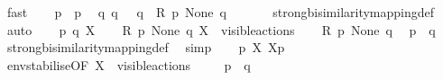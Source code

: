 \begin{isabellebody}
\ fast\isanewline
\ \ \isamarkupfalse%
\ {\isacartoucheopen}p\ {\isasymlongmapsto}{\isasymtau}\ p{\isacharprime}{\kern0pt}{\isacartoucheclose}\ \isamarkupfalse%
\ {\isacartoucheopen}{\isasymexists}q{\isacharprime}{\kern0pt}{\isachardot}{\kern0pt}\ q\ {\isasymlongmapsto}{\isasymtau}\ \ q{\isacharprime}{\kern0pt}\ {\isasymand}\ {\isacharquery}{\kern0pt}R\ p{\isacharprime}{\kern0pt}\ None\ q{\isacharprime}{\kern0pt}{\isacartoucheclose}\ \isanewline
\ \ \ \ \isamarkupfalse%
\ strong{\isacharunderscore}{\kern0pt}bisimilarity{\isacharunderscore}{\kern0pt}mapping{\isacharunderscore}{\kern0pt}def\ \isamarkupfalse%
\ auto\isanewline
{}\isamarkupfalse%
\isanewline
\ \ \isamarkupfalse%
\ p\ q\ X\isanewline
\ \ \isamarkupfalse%
\ {\isacartoucheopen}{\isacharquery}{\kern0pt}R\ p\ None\ q{\isacartoucheclose}\ {\isacartoucheopen}X\ {\isasymsubseteq}\ visible{\isacharunderscore}{\kern0pt}actions{\isacartoucheclose}\isanewline
\ \ \isamarkupfalse%
\ {\isacartoucheopen}{\isacharquery}{\kern0pt}R\ p\ None\ q{\isacartoucheclose}\ \isamarkupfalse%
\ {\isacartoucheopen}{\isasymtheta}{\isacharparenleft}{\kern0pt}p{\isacharparenright}{\kern0pt}\ {\isasymleftrightarrow}\ {\isasymtheta}{\isacharparenleft}{\kern0pt}q{\isacharparenright}{\kern0pt}{\isacartoucheclose}\ \isamarkupfalse%
\ strong{\isacharunderscore}{\kern0pt}bisimilarity{\isacharunderscore}{\kern0pt}mapping{\isacharunderscore}{\kern0pt}def\ \isamarkupfalse%
\ simp\isanewline
\ \ \isamarkupfalse%
\ {\isacartoucheopen}{\isasymtheta}{\isacharparenleft}{\kern0pt}p{\isacharparenright}{\kern0pt}\ {\isasymlongmapsto}\isactrlsup {\isasymtheta}{\isasymepsilon}{\isacharbrackleft}{\kern0pt}X{\isacharbrackright}{\kern0pt}\ {\isasymtheta}{\isacharbrackleft}{\kern0pt}X{\isacharbrackright}{\kern0pt}{\isacharparenleft}{\kern0pt}p{\isacharparenright}{\kern0pt}{\isacartoucheclose}\ \isamarkupfalse%
\ env{\isacharunderscore}{\kern0pt}stabilise{\isacharbrackleft}{\kern0pt}OF\ {\isacartoucheopen}X\ {\isasymsubseteq}\ visible{\isacharunderscore}{\kern0pt}actions{\isacartoucheclose}{\isacharbrackright}{\kern0pt}\ \isacommand{{\isachardot}{\kern0pt}}\isamarkupfalse%
\isanewline
\ \ \isamarkupfalse%
\ {\isacartoucheopen}{\isasymtheta}{\isacharparenleft}{\kern0pt}p{\isacharparenright}{\kern0pt}\ {\isasymleftrightarrow}\ {\isasymtheta}{\isacharparenleft}{\kern0pt}q{\isacharparenright}{\kern0pt}{\isacartoucheclose}\ \isamarkupfalse%

\end{isabellebody}
